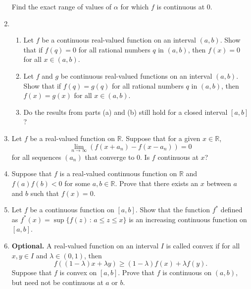 \documentclass[12pt]{article}
\newcommand{\R}{\mathbb{R}}
\newcommand{\sep}{\,:\,}
\begin{document}
\begin{enumerate}
\begin{equation}
    \end{equation}
    Find the exact range of values of $\alpha$ for which $f$ is continuous
    at 0.
  \item
    \begin{enumerate}
      \item Let $f$ be a continuous real-valued function on an interval
        $(a,b)$. Show that if $f(q)=0$ for all rational numbers $q$ in $(a,b)$,
        then $f(x)=0$ for all $x\in (a,b)$.
      \item Let $f$ and $g$ be continuous real-valued functions on an interval
        $(a,b)$. Show that if $f(q)=g(q)$ for all rational numbers $q$ in
        $(a,b)$, then $f(x)=g(x)$ for all $x\in (a,b)$.
      \item Do the results from parts (a) and (b) still hold for a closed
        interval $[a,b]$?
    \end{enumerate}
  \item Let $f$ be a real-valued function on $\R$. Suppose that for a given
    $x \in \R$,
    \begin{equation}
      \lim_{n\to\infty} \left( f(x+a_n) - f(x-a_n) \right) =0
    \end{equation}
    for all sequences $(a_n)$ that converge to 0. Is $f$ continuous at $x$?
  \item Suppose that $f$ is a real-valued continuous function on $\R$ and
    $f(a)f(b)<0$ for some $a,b\in \R$. Prove that there exists an $x$ between
    $a$ and $b$ such that $f(x)=0$.
  \item Let $f$ be a continuous function on $[a,b]$. Show that the function
    $f^*$ defined as $f^*(x) = \sup \{f(z) \sep a \le z \le x\}$ is an
    increasing continuous function on $[a,b]$.
  \item \textbf{Optional.} A real-valued function on an interval $I$ is called
    convex if for all $x,y\in I$ and $\lambda \in (0,1)$, then
    \begin{equation}
      f((1-\lambda)x+\lambda y) \ge (1-\lambda) f(x) + \lambda f(y).
    \end{equation}
    Suppose that $f$ is convex on $[a,b]$. Prove that $f$ is continuous on
    $(a,b)$, but need not be continuous at $a$ or $b$.    
\end{enumerate}
\end{document}
